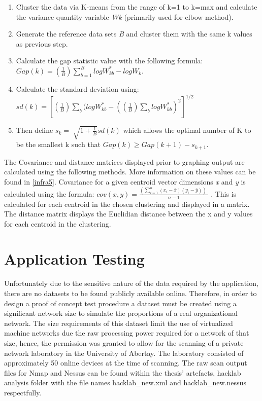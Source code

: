 \begin{enumerate}

\item Cluster the data via K-means from the range of k=1 to k=max and calculate the variance quantity variable \textit{Wk} (primarily used for elbow method).
\item Generate the reference data sets \textit{B} and cluster them with the same k values as previous step. 
\item Calculate the gap statistic value with the following formula: \linebreak
$Gap\left( k \right) = \left( {\frac{1}{B}} \right)\mathop \sum \limits_{b = 1}^B logW_{kb}^* - log{W_k}.$
\item Calculate the standard deviation using: \linebreak
$sd\left( k \right) = {\left[ {\left( {\frac{1}{B}} \right)\mathop \sum \limits_b (logW_{kb}^* - {{(\left( {\frac{1}{B}} \right)\mathop \sum \limits_b logW_{kb}^*)}^2}} \right]^{1/2}}$
\item Then define ${s_k} = \;\sqrt {1 + \frac{1}{B}} sd\left( k \right)$ which allows the optimal number of K to be the smallest k such that $Gap\left( k \right) \ge Gap\left( {k + 1} \right) - {s_{k + 1}}$. 

\end{enumerate}

The Covariance and distance matrices displayed prior to graphing output are calculated using the following methods. More information on these values can be found in \ref{infra5}.
Covariance for a given centroid vector dimensions \textit{x} and \textit{y} is calculated using the formula: $cov\left( {x,y} \right) = \frac{{(\mathop \sum \nolimits_{i = 1}^n \left( {{x_i} - \bar x} \right)\left( {{y_i} - \bar y} \right))\;}}{{n - 1}}$ . This is calculated for each centroid in the chosen clustering and displayed in a matrix.
The distance matrix displays the Euclidian distance between the x and y values for each centroid in the clustering.

\section{Application Testing}
\label{testing}
\paragraph{}Unfortunately due to the sensitive nature of the data required by the application, there are no datasets to be found publicly available online. Therefore, in order to design a proof of concept test procedure a dataset must be created using a significant network size to simulate the proportions of a real organizational network. The size requirements of this dataset limit the use of virtualized machine networks due the raw processing power required for a network of that size, hence, the permission was granted to allow for the scanning of a private network laboratory in the University of Abertay. The laboratory consisted of approximately 50 online devices at the time of scanning. The raw scan output files for Nmap and Nessus can be found within the thesis’ artefacts, hacklab analysis folder with the file names hacklab\_new.xml and hacklab\_new.nessus respectfully.


